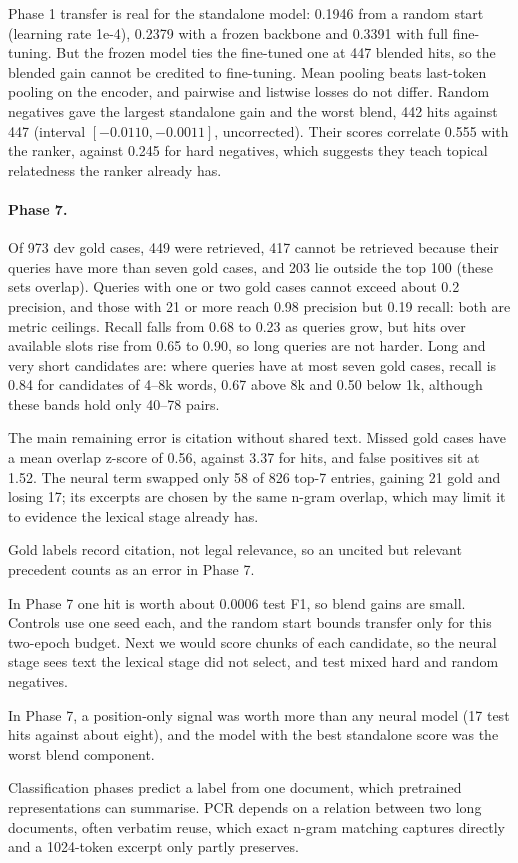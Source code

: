 Phase 1 transfer is real for the standalone model: 0.1946 from a random start (learning rate 1e-4), 0.2379 with a frozen backbone and 0.3391 with full fine-tuning. But the frozen model ties the fine-tuned one at 447 blended hits, so the blended gain cannot be credited to fine-tuning. Mean pooling beats last-token pooling on the encoder, and pairwise and listwise losses do not differ. Random negatives gave the largest standalone gain and the worst blend, 442 hits against 447 (interval $[-0.0110, -0.0011]$, uncorrected). Their scores correlate 0.555 with the ranker, against 0.245 for hard negatives, which suggests they teach topical relatedness the ranker already has.

\paragraph{Phase 7.} Of 973 dev gold cases, 449 were retrieved, 417 cannot be retrieved because their queries have more than seven gold cases, and 203 lie outside the top 100 (these sets overlap). Queries with one or two gold cases cannot exceed about 0.2 precision, and those with 21 or more reach 0.98 precision but 0.19 recall: both are metric ceilings. Recall falls from 0.68 to 0.23 as queries grow, but hits over available slots rise from 0.65 to 0.90, so long queries are not harder. Long and very short candidates are: where queries have at most seven gold cases, recall is 0.84 for candidates of 4--8k words, 0.67 above 8k and 0.50 below 1k, although these bands hold only 40--78 pairs.

The main remaining error is citation without shared text. Missed gold cases have a mean overlap z-score of 0.56, against 3.37 for hits, and false positives sit at 1.52. The neural term swapped only 58 of 826 top-7 entries, gaining 21 gold and losing 17; its excerpts are chosen by the same n-gram overlap, which may limit it to evidence the lexical stage already has.

Gold labels record citation, not legal relevance, so an uncited but relevant precedent counts as an error in Phase 7.

In Phase 7 one hit is worth about 0.0006 test F1, so blend gains are small. Controls use one seed each, and the random start bounds transfer only for this two-epoch budget. Next we would score chunks of each candidate, so the neural stage sees text the lexical stage did not select, and test mixed hard and random negatives.

In Phase 7, a position-only signal was worth more than any neural model (17 test hits against about eight), and the model with the best standalone score was the worst blend component.

Classification phases predict a label from one document, which pretrained representations can summarise. PCR depends on a relation between two long documents, often verbatim reuse, which exact n-gram matching captures directly and a 1024-token excerpt only partly preserves.
